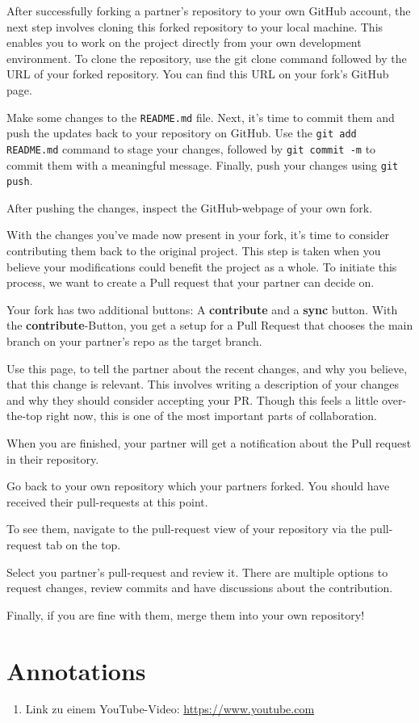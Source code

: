 \documentclass{dcbl/challenge}
\begin{document}
\begin{aufgabe}
    After successfully forking a partner's repository to your own GitHub account, the next step involves cloning this forked repository to your local machine. This enables you to work on the project directly from your own development environment. To clone the repository, use the git clone command followed by the URL of your forked repository. You can find this URL on your fork's GitHub page.
    
    Make some changes to the \texttt{README.md} file. Next, it's time to commit them and push the updates back to your repository on GitHub. Use the \texttt{git add README.md} command to stage your changes, followed by  \texttt{git commit -m} to commit them with a meaningful message. Finally, push your changes using \texttt{git push}. 
    
    After pushing the changes, inspect the GitHub-webpage of your own fork.
\end{aufgabe}

\begin{aufgabe}
    With the changes you've made now present in your fork, it's time to consider contributing them back to the original project. This step is taken when you believe your modifications could benefit the project as a whole. To initiate this process, we want to create a Pull request that your partner can decide on.
    
    Your fork has two additional buttons: A \textbf{contribute} and a \textbf{sync} button. With the \textbf{contribute}-Button, you get a setup for a Pull Request that chooses the main branch on your partner's repo as the target branch.
    
    Use this page, to tell the partner about the recent changes, and why you believe, that this change is relevant. This involves writing a description of your changes and why they should consider accepting your PR. Though this feels a little over-the-top right now, this is one of the most important parts of collaboration.
    
    When you are finished, your partner will get a notification about the Pull request in their repository. 
\end{aufgabe}

\begin{aufgabe}
    Go back to your own repository which your partners forked. You should have received their pull-requests at this point.
    
    To see them, navigate to the pull-request view of your repository via the pull-request tab on the top. 

    Select you partner's pull-request and review it. There are multiple options to request changes, review commits and have discussions about the contribution.
    
    Finally, if you are fine with them, merge them into your own repository!
\end{aufgabe}

\section*{Annotations}
\begin{enumerate}
    \item Link zu einem YouTube-Video: \url{https://www.youtube.com}
\end{enumerate}
\end{document}
